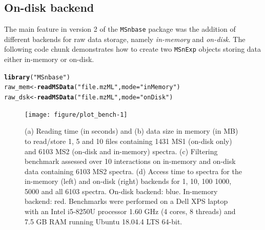 \documentclass[journal=jacsat,manuscript=article]{achemso}\usepackage[]{graphicx}\usepackage[]{color}
\makeatletter
\newcommand{\hlstr}[1]{\textcolor[rgb]{0.192,0.494,0.8}{#1}}%
\newcommand{\hlstd}[1]{\textcolor[rgb]{0.345,0.345,0.345}{#1}}%
\newcommand{\hlkwb}[1]{\textcolor[rgb]{0.69,0.353,0.396}{#1}}%
\newcommand{\hlkwc}[1]{\textcolor[rgb]{0.333,0.667,0.333}{#1}}%
\newcommand{\hlkwd}[1]{\textcolor[rgb]{0.737,0.353,0.396}{\textbf{#1}}}%
\newenvironment{kframe}{%
 \def\at@end@of@kframe{}%
 \ifinner\ifhmode%
  \def\at@end@of@kframe{\end{minipage}}%
  \begin{minipage}{\columnwidth}%
 \fi\fi%
 \def\FrameCommand##1{\hskip\@totalleftmargin \hskip-\fboxsep
 \colorbox{shadecolor}{##1}\hskip-\fboxsep
     \hskip-\linewidth \hskip-\@totalleftmargin \hskip\columnwidth}%
 \MakeFramed {\advance\hsize-\width
   \@totalleftmargin\z@ \linewidth\hsize
   \@setminipage}}%
 {\par\unskip\endMakeFramed%
 \at@end@of@kframe}
\newenvironment{knitrout}{}{} %
\makeatother
\begin{document}
\subsection{On-disk backend}

The main feature in version 2 of the \texttt{MSnbase} package was the
addition of different backends for raw data storage, namely
\textit{in-memory} and \textit{on-disk}. The following code chunk
demonstrates how to create two \texttt{MSnExp} objects storing data
either in-memory or on-disk. 

\begin{knitrout}
\color{fgcolor}\begin{kframe}
\begin{alltt}
\hlkwd{library}\hlstd{(}\hlstr{"MSnbase"}\hlstd{)}
\hlstd{raw_mem} \hlkwb{<-} \hlkwd{readMSData}\hlstd{(}\hlstr{"file.mzML"}\hlstd{,} \hlkwc{mode} \hlstd{=} \hlstr{"inMemory"}\hlstd{)}
\hlstd{raw_dsk} \hlkwb{<-} \hlkwd{readMSData}\hlstd{(}\hlstr{"file.mzML"}\hlstd{,} \hlkwc{mode} \hlstd{=} \hlstr{"onDisk"}\hlstd{)}
\end{alltt}
\end{kframe}
\end{knitrout}







\begin{figure}[p]
  \centering
\begin{knitrout}
\color{fgcolor}
\texttt{[image: figure/plot\_bench-1]} 

\end{knitrout}
\caption{(a) Reading time (in seconds) and (b) data size in memory (in
  MB) to read/store 1, 5 and 10 files containing 1431 MS1 (on-disk
  only) and 6103 MS2 (on-disk and in-memory) spectra. (c) Filtering
  benchmark assessed over 10 interactions on in-memory and on-disk
  data containing 6103 MS2 spectra.  (d) Access time to spectra for
  the in-memory (left) and on-disk (right) backends for 1, 10, 100
  1000, 5000 and all 6103 spectra. On-disk backend: blue. In-memory
  backend: red. Benchmarks were performed on a Dell XPS laptop with an
  Intel i5-8250U processor 1.60 GHz (4 cores, 8 threads) and 7.5 GB RAM
  running Ubuntu 18.04.4 LTS 64-bit. }
\label{fig:bench}
\end{figure}
\end{document}
